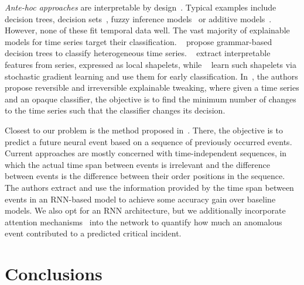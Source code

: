 \documentclass[letterpaper]{article} %
\begin{document}
\vspace{-0.81mm}
\vspace{-1.76mm}  \textit{Ante-hoc approaches} are interpretable by design~\cite{nphard}. Typical examples include decision trees, decision sets~\cite{decisionsets,anchors}, fuzzy inference models~\cite{pairwise} or additive models~\cite{additive}. However, none of these fit temporal data well.  The vast majority of explainable models for time series target their classification. ~\cite{categorization} propose grammar-based decision trees to classify heterogeneous time series.
~\cite{earlyclass,shapelets} extract interpretable features from series, expressed as local shapelets, while ~\cite{dtw} learn such shapelets via stochastic gradient learning and use them for early classification. In~\cite{irreversible}, the authors propose reversible and irreversible explainable tweaking, where given a time series and an opaque classifier, the objective is to find the minimum number of changes to the time series such that the classifier changes its decision.

\vspace{-0.75mm}
\vspace{-1.50mm}
\vspace{-2.33mm}
Closest to our problem is the method proposed in~\cite{iclr2018}. There, the objective is to predict a future neural event based on a sequence of previously occurred events. Current approaches are mostly concerned with time-independent sequences, in which the actual time span between events is irrelevant and the difference between events is the difference between their order positions in the sequence. The authors extract and use the information provided by the time span between events in an RNN-based model to achieve some accuracy gain over baseline models. We also opt for an RNN architecture, but we additionally incorporate attention mechanisms~\cite{attention} into the network to quantify how much an anomalous event contributed to a predicted critical incident.


\section{Conclusions}
\end{document}
